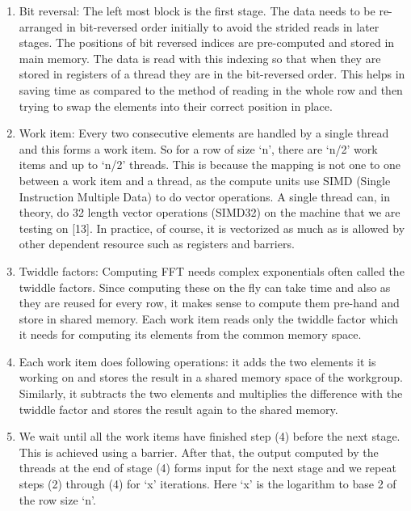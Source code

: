 \documentclass[sigconf]{acmart}
\begin{document}
\begin{enumerate}
\item Bit reversal: The left most block is the first stage. The data needs to be re-arranged in bit-reversed order initially to avoid the strided reads in later stages. The positions of bit reversed indices are pre-computed and stored in main memory. The data is read with this indexing so that when they are stored in registers of a thread they are in the bit-reversed order. This helps in saving time as compared to the method of reading in the whole row and then trying to swap the elements into their correct position in place.
\item Work item: Every two consecutive elements are handled by a single thread and this forms a work item. So for a row of size ‘n’, there are ‘n/2’ work items and up to ‘n/2’ threads. This is because the mapping is not one to one between a work item and a thread, as the compute units use SIMD (Single Instruction Multiple Data) to do vector operations. A single thread can, in theory, do 32 length vector operations (SIMD32) on the machine that we are testing on [13]. In practice, of course, it is vectorized as much as is allowed by other dependent resource such as registers and barriers.
\item Twiddle factors: Computing FFT needs complex exponentials often called the twiddle factors. Since computing these on the fly can take time and also as they are reused for every row, it makes sense to compute them pre-hand and store in shared memory. Each work item reads only the twiddle factor which it needs for computing its elements from the common memory space. 
\item Each work item does following operations: it adds the two elements it is working on and stores the result in a shared memory space of the workgroup. Similarly, it subtracts the two elements and multiplies the difference with the twiddle factor and stores the result again to the shared memory.
\item We wait until all the work items have finished step (4) before the next stage. This is achieved using a barrier. After that, the output computed by the threads at the end of stage (4) forms input for the next stage and we repeat steps (2) through (4) for ‘x’ iterations. Here ‘x’ is the logarithm to base 2 of the row size ‘n’.	
\end{enumerate}
\end{document}
